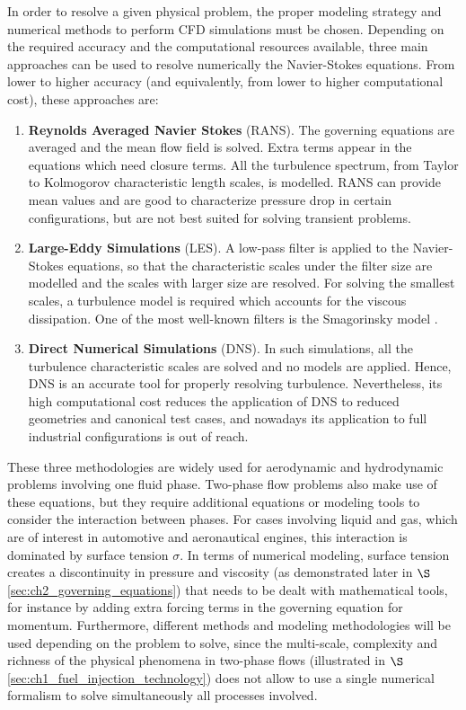 In order to resolve a given physical problem, the proper modeling strategy and numerical methods to perform CFD simulations must be chosen. Depending on the required accuracy and the computational resources available, three main approaches can be used to resolve numerically the Navier-Stokes equations. From lower to higher accuracy (and equivalently, from lower to higher computational cost), these approaches are:

\begin{enumerate}

	\item \textbf{Reynolds Averaged Navier Stokes} (RANS). The governing equations are averaged and the mean flow field is solved. Extra terms appear in the equations which need closure terms. All the turbulence spectrum, from Taylor to Kolmogorov characteristic length scales, is modelled. RANS can provide mean values and are good to characterize pressure drop in certain configurations, but are not best suited for solving transient problems.
	
	\item \textbf{Large-Eddy Simulations} (LES). A low-pass filter is applied to the Navier-Stokes equations, so that the characteristic scales under the filter size are modelled and the scales with larger size are resolved. For solving the smallest scales, a turbulence model is required which accounts for the viscous dissipation. One of the most well-known filters is the Smagorinsky model .
	
	\item \textbf{Direct Numerical Simulations} (DNS). In such simulations, all the turbulence characteristic scales are solved and no models are applied. Hence, DNS is an accurate tool for properly resolving turbulence. Nevertheless, its high computational cost reduces the application of DNS to reduced geometries and canonical test cases, and nowadays its application to full industrial configurations is out of reach.

\end{enumerate}

These three methodologies are widely used for aerodynamic and hydrodynamic problems involving one fluid phase. Two-phase flow problems also make use of these equations, but they require additional equations or modeling tools to consider the interaction between phases. For cases involving liquid and gas, which are of interest in automotive and aeronautical engines, this interaction is dominated by surface tension $\sigma$. In terms of numerical modeling, surface tension creates a discontinuity in pressure and viscosity (as demonstrated later in $\S$\ref{sec:ch2_governing_equations}) that needs to be dealt with mathematical tools, for instance by adding extra forcing terms in the governing equation for momentum. Furthermore, different methods and modeling methodologies will be used depending on the problem to solve, since the multi-scale, complexity and richness of the physical phenomena in two-phase flows (illustrated in $\S$\ref{sec:ch1_fuel_injection_technology}) does not allow to use a single numerical formalism to solve simultaneously all processes involved.

